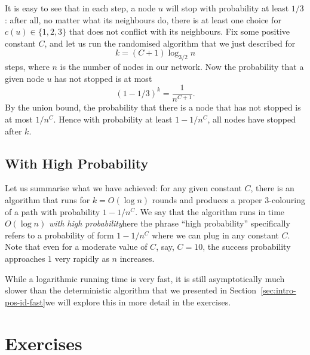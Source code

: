 It is easy to see that in each step, a node $u$ will stop with probability at least $1/3$: after all, no matter what its neighbours do, there is at least one choice for $c(u) \in \{1,2,3\}$ that does not conflict with its neighbours. Fix some positive constant $C$, and let us run the randomised algorithm that we just described for
\[
    k = (C+1) \log_{3/2} n
\]
steps, where $n$ is the number of nodes in our network. Now the probability that a given node $u$ has not stopped is at most
\[
    (1 - 1/3)^k = \frac{1}{n^{C+1}}.
\]
By the union bound, the probability that there is a node that has not stopped is at most $1/n^C$. Hence with probability at least $1-1/n^C$, all nodes have stopped after $k$.


\subsection{With High Probability}

Let us summarise what we have achieved: for any given constant $C$, there is an algorithm that runs for $k = O(\log n)$ rounds and produces a proper $3$-colouring of a path with probability $1-1/n^C$. We say that the algorithm runs in time $O(\log n)$ \emph{with high probability}\mydash here the phrase ``high probability'' specifically refers to a probability of form $1-1/n^C$ where we can plug in any constant $C$. Note that even for a moderate value of $C$, say, $C = 10$, the success probability approaches $1$ very rapidly as $n$ increases.

While a logarithmic running time is very fast, it is still asymptotically much slower than the deterministic algorithm that we presented in Section~\ref{sec:intro-pos-id-fast}\mydash we will explore this in more detail in the exercises.


\section{Exercises}

